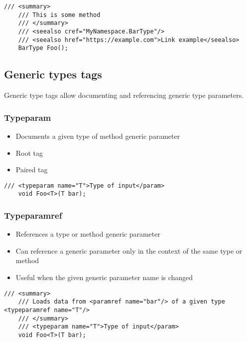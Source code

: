 \begin{lstlisting}[caption=Seealso tag]
    /// <summary>
    /// This is some method
    /// </summary>
    /// <seealso cref="MyNamespace.BarType"/>
    /// <seealso href="https://example.com">Link example</seealso>
    BarType Foo();
\end{lstlisting}

\subsection{Generic types tags}

Generic type tags allow documenting and referencing generic type parameters.

\subsubsection*{Typeparam}
\begin{itemize}
    \item Documents a given type of method generic parameter
    \item Root tag
    \item Paired tag
\end{itemize}

\begin{lstlisting}[caption=Typeparam tag]
    /// <typeparam name="T">Type of input</param>
    void Foo<T>(T bar);
\end{lstlisting}

\subsubsection*{Typeparamref}
\begin{itemize}
    \item References a type or method generic parameter
    \item Can reference a generic parameter only in the context of the same type or method
    \item Useful when the given generic parameter name is changed
\end{itemize}

\begin{lstlisting}[caption=Typeparamref tag]
    /// <summary>
    /// Loads data from <paramref name="bar"/> of a given type <typeparamref name="T"/>
    /// </summary>
    /// <typeparam name="T">Type of input</param>
    void Foo<T>(T bar);
\end{lstlisting}